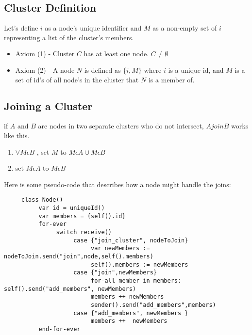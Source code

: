 \subsection{Cluster Definition}
Let's define $i$ as a node's unique identifier and $M$ as a non-empty set of $i$ representing a list of the cluster's members.

\begin{itemize}
\item Axiom (1) - Cluster $C$ has at least one node.  $C \not= \emptyset$
\item Axiom (2) - A node $N$ is defined as $\{i,M\}$ where $i$ is a unique id, and $M$ is a set of id's of all  node's in the cluster that $N$ is a member of. 
\end{itemize}

\subsection{Joining a Cluster}
if $A$ and $B$ are nodes in two separate clusters who do not intersect, $A join B$ works like this.


\begin{enumerate}
\item $\forall M \epsilon B$ , set $M$  to $M\epsilon A \cup M\epsilon B$
\item set $M \epsilon A$ to $M\epsilon B$

\end{enumerate}




Here is some pseudo-code that describes how a node might handle the joins:


\begin{verbatim}
     class Node()
          var id = uniqueId()
          var members = {self().id}
          for-ever
               switch receive()
                    case {"join_cluster", nodeToJoin}
                         var newMembers := nodeToJoin.send("join",node,self().members)
                         self().members := newMembers
                    case {"join",newMembers}
                         for-all member in members: self().send("add_members", newMembers)
                         members ++ newMembers
                         sender().send("add_members",members)
                    case {"add_members", newMembers }
                         members ++  newMembers
          end-for-ever
\end{verbatim}




